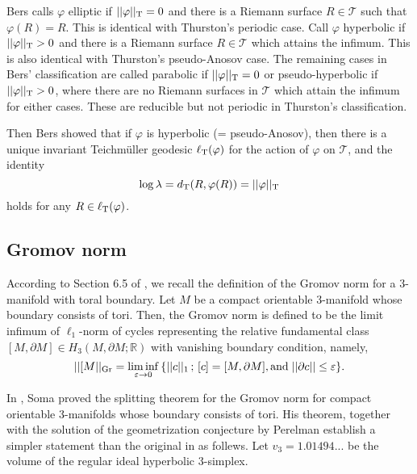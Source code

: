 \documentclass[11pt,reqno]{amsart}
\numberwithin{equation}{section}
\begin{document}
Bers calls  $\varphi$  elliptic if  $|| \varphi ||_{\rm T} = 0$  and 
there is a Riemann surface   $R \in \mathcal{T}$  such that  $\varphi(R) = R$.  
This is identical with Thurston's periodic case.    
Call  $\varphi$  hyperbolic if  $|| \varphi ||_{\rm T} >0$  and there is 
a Riemann surface  $R \in \mathcal{T}$  which attains the infimum.  
This is also identical with Thurston's pseudo-Anosov case.    
The remaining cases in Bers' classification are called 
parabolic if  $|| \varphi ||_{\rm T} = 0$  or pseudo-hyperbolic if  $|| \varphi ||_{\rm T} > 0$,  
where there are no Riemann surfaces in  $\mathcal{T}$  which attain the infimum for 
either cases.  
These are reducible but not periodic in Thurston's classification. 

Then Bers showed that if  $\varphi$  is hyperbolic (= pseudo-Anosov), 
then there is a unique invariant Teichm\"uller geodesic  $\ell_{\rm T}(\varphi)$  
for the action of  $\varphi$  on  $\mathcal{T}$,  
and the identity 
\begin{equation*}
	\log \lambda = d_{\rm T}(R, \varphi(R)) = || \varphi ||_{\rm T} 
\end{equation*} 
holds for any  $R \in \ell_{\rm T}(\varphi)$.   

\subsection{Gromov norm} 

According to Section 6.5 of \cite{Thurston1}, 
we recall the definition of the Gromov norm for a 3-manifold with toral boundary.  
Let   $M$  be a compact orientable 3-manifold whose boundary consists of tori.  
Then, 
the Gromov norm is defined to be the limit infimum of 
$\ell_1$-norm of cycles representing the relative fundamental class  
$[M, \partial M] \in H_3(M, \partial M; \mathbb{R})$  with 
vanishing boundary condition, 
namely, 
\begin{equation*}
	||[M||_{{\rm Gr}} = 
	\liminf_{\varepsilon \to 0} \, \{ ||c||_1 \, ; \, 
		[c] = [M, \partial M], \text{and} \; || \partial c || \leq \varepsilon \}.  
\end{equation*}

In \cite{Soma}, 
Soma proved the splitting theorem for the Gromov norm 
for compact orientable 3-manifolds whose boundary consists of tori.  
His theorem,  
together with the solution of the geometrization conjecture 
by Perelman  \cite{Perelman1, Perelman2}  
establish a simpler statement than the original in  \cite{Soma} as follews.  
Let  $v_3 = 1.01494...$  be the volume of the regular ideal hyperbolic 3-simplex. 
\end{document}
